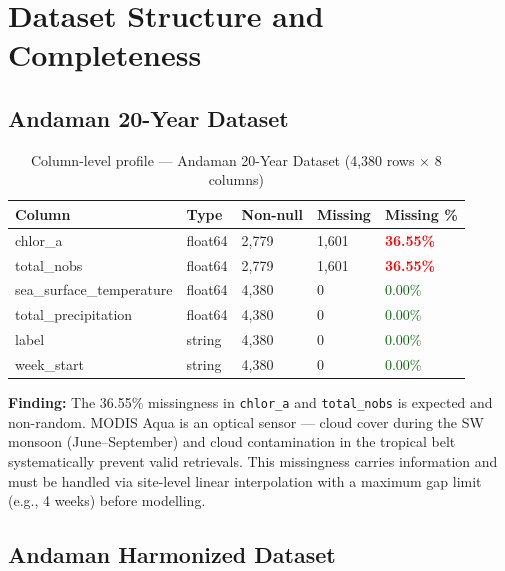 \documentclass[12pt,a4paper]{report}
\begin{document}
\section{Dataset Structure and Completeness}

\subsection{Andaman 20-Year Dataset}

\begin{table}[H]
\centering
\caption{Column-level profile — Andaman 20-Year Dataset (4,380 rows $\times$ 8 columns)}
\begin{tabular}{L{4.5cm}C{2cm}R{1.8cm}R{1.8cm}R{2cm}}
\toprule
\textbf{Column} & \textbf{Type} & \textbf{Non-null} & \textbf{Missing} & \textbf{Missing \%} \\
\midrule
{}
chlor\_a & float64 & 2,779 & 1,601 & \textcolor{red}{\textbf{36.55\%}} \\
total\_nobs & float64 & 2,779 & 1,601 & \textcolor{red}{\textbf{36.55\%}} \\
sea\_surface\_temperature & float64 & 4,380 & 0 & \textcolor{darkgreen}{0.00\%} \\
total\_precipitation & float64 & 4,380 & 0 & \textcolor{darkgreen}{0.00\%} \\
label & string & 4,380 & 0 & \textcolor{darkgreen}{0.00\%} \\
week\_start & string & 4,380 & 0 & \textcolor{darkgreen}{0.00\%} \\
\bottomrule
\end{tabular}
\label{tab:profile_20y}
\end{table}

\begin{findingbox}
\textbf{Finding:} The 36.55\% missingness in \texttt{chlor\_a} and \texttt{total\_nobs}
is expected and non-random. MODIS Aqua is an optical sensor — cloud cover during the
SW monsoon (June--September) and cloud contamination in the tropical belt systematically
prevent valid retrievals. This missingness carries information and must be handled via
site-level linear interpolation with a maximum gap limit (e.g., 4 weeks) before modelling.
\end{findingbox}

\subsection{Andaman Harmonized Dataset}
\end{document}

